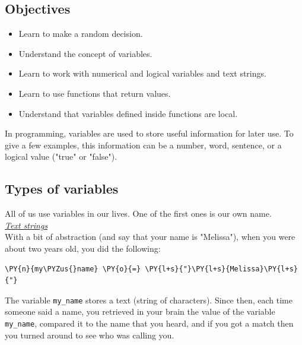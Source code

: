 \subsection[\ \ Objectives]{Objectives} 
 
\begin{itemize}
\item Learn to make a random decision.
\item Understand the concept of variables.
\item Learn to work with numerical and logical variables and text strings.
\item Learn to use functions that return values. 
\item Understand that variables defined inside functions are local. 
\end{itemize}

\noindent
In programming, variables are used to store useful information for later use. 
To give a few examples, this information can be a number, word, sentence, 
or a logical value ("true" or "false").

\subsection[\ \ Types of variables]{Types of variables}

All of us use variables in our lives. One of 
the first ones is our own name. \\

\noindent
\underline{\em Text strings}\\

\noindent
With a bit of abstraction (and say that your name is "Melissa"), 
when you were about two years old, you did the following:\\

\begin{bbox}
\begin{Verbatim}[commandchars=\\\{\}]
\PY{n}{my\PYZus{}name} \PY{o}{=} \PY{l+s}{"}\PY{l+s}{Melissa}\PY{l+s}{"}
\end{Verbatim}
\end{bbox}
\vspace{6mm}

\noindent
The variable {\tt my\_name} stores a text (string of characters). 
Since then, each time someone said a name, you retrieved in your brain the value of the variable
{\tt my\_name}, compared it to the name that you heard, and if you got a match then you turned around 
to see who was calling you. \\

